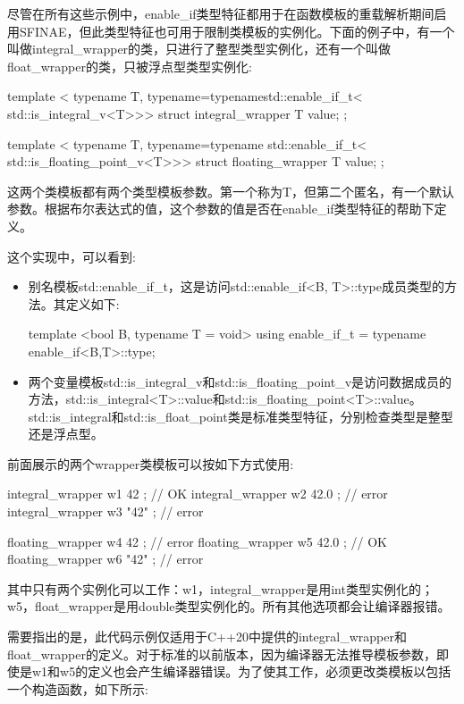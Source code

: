 尽管在所有这些示例中，enable\_if类型特征都用于在函数模板的重载解析期间启用SFINAE，但此类型特征也可用于限制类模板的实例化。下面的例子中，有一个叫做integral\_wrapper的类，只进行了整型类型实例化，还有一个叫做float\_wrapper的类，只被浮点型类型实例化:

\begin{cpp}
template <
	typename T,
	typename=typenamestd::enable_if_t<
						 std::is_integral_v<T>>>
struct integral_wrapper
{
	T value;
};

template <
	typename T,
	typename=typename std::enable_if_t<
						 std::is_floating_point_v<T>>>
struct floating_wrapper
{
	T value;
};
\end{cpp}

这两个类模板都有两个类型模板参数。第一个称为T，但第二个匿名，有一个默认参数。根据布尔表达式的值，这个参数的值是否在enable\_if类型特征的帮助下定义。

这个实现中，可以看到:

\begin{itemize}
\item
别名模板std::enable\_if\_t，这是访问std::enable\_if<B, T>::type成员类型的方法。其定义如下:

\begin{cpp}
template <bool B, typename T = void>
using enable_if_t = typename enable_if<B,T>::type;
\end{cpp}

\item
两个变量模板std::is\_integral\_v和std::is\_floating\_point\_v是访问数据成员的方法，std::is\_integral<T>::value和std::is\_floating\_point<T>::value。std::is\_integral和std::is\_float\_point类是标准类型特征，分别检查类型是整型还是浮点型。
\end{itemize}

前面展示的两个wrapper类模板可以按如下方式使用:

\begin{cpp}
integral_wrapper w1{ 42 }; // OK
integral_wrapper w2{ 42.0 }; // error
integral_wrapper w3{ "42" }; // error

floating_wrapper w4{ 42 }; // error
floating_wrapper w5{ 42.0 }; // OK
floating_wrapper w6{ "42" }; // error
\end{cpp}

其中只有两个实例化可以工作：w1，integral\_wrapper是用int类型实例化的；w5，float\_wrapper是用double类型实例化的。所有其他选项都会让编译器报错。

需要指出的是，此代码示例仅适用于C++20中提供的integral\_wrapper和float\_wrapper的定义。对于标准的以前版本，因为编译器无法推导模板参数，即使是w1和w5的定义也会产生编译器错误。为了使其工作，必须更改类模板以包括一个构造函数，如下所示:

